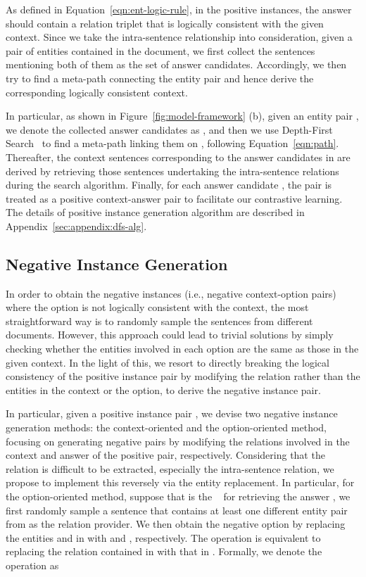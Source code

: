As defined in Equation~\ref{eqn:ent-logic-rule}, in the positive instances, the answer should contain a relation triplet that is logically consistent with the given context. 
Since we take the intra-sentence relationship into consideration, given a pair of entities contained in the document,
we first collect the sentences mentioning both of them as the set of answer candidates.
Accordingly, we then try to find a meta-path connecting the entity pair and hence derive the corresponding logically consistent context. 


In particular, as shown in Figure~\ref{fig:model-framework} (b), given an entity pair , we denote the collected answer candidates as ,
and then we use Depth-First Search~\citep{dfs-Tarjan72} to find a meta-path linking them on , following Equation~\ref{eqn:path}.
Thereafter, the context sentences  corresponding to the answer candidates in  are derived by retrieving those sentences undertaking the intra-sentence relations during the search algorithm.
Finally, for each answer candidate , the pair  is treated as a positive context-answer pair to facilitate our contrastive learning.
The details of positive instance generation algorithm are described in Appendix~\ref{sec:appendix:dfs-alg}.


\subsection{Negative Instance Generation}
\label{sec:method:data-construction}



In order to obtain the negative instances (i.e., negative context-option pairs) where the option is not logically consistent with the context,
the most straightforward way is to randomly sample the sentences from different documents.
However, this approach could lead to trivial solutions by simply checking whether the entities involved in each option are the same as those in the given context.
In the light of this, we resort to directly breaking the logical consistency of the positive instance pair by modifying the relation rather than the entities in the context or the option, to derive the negative instance pair. 


In particular, given a positive instance pair , we devise two negative instance generation methods: the context-oriented and the option-oriented method, focusing on generating negative pairs by modifying the relations involved in the context  and answer  of the positive pair, respectively.
Considering that the relation is difficult to be extracted, especially the intra-sentence relation,
we propose to implement this reversely via the entity replacement.
In particular, for the option-oriented method, suppose that  is the \ntgtentp~ for retrieving the answer , we first randomly sample a sentence  that contains at least one different entity pair  from  as the relation provider. 
We then obtain the negative option by replacing the entities  and  in  with  and , respectively.
The operation is equivalent to replacing the relation contained in  with that in . Formally, we denote the operation as 


